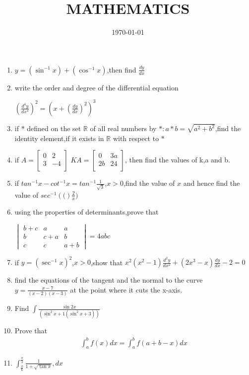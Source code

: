 \documentclass[2pt,-letter paper]{article}
\title{MATHEMATICS}
\date{\today}
\providecommand{\mydet}[1]{\ensuremath{\begin{vmatrix}#1\end{vmatrix}}}
\providecommand{\myvec}[1]{\ensuremath{\begin{bmatrix}#1\end{bmatrix}}}
\providecommand{\brak}[1]{\ensuremath{\left(#1\right)}}
\begin{document}
\maketitle

\begin{enumerate}


\item $y=(\sin^{-1}x)+(\cos^{-1}x)$,then find $\frac{dy}{dx}$
\item write the order and degree of the differential equation
                              
	$(\frac{d^4y}{dx^4})^2 = (x+(\frac{dy}{dx})^2)^3$
  	  
\item if $\ast$ defined on the set $\mathbb{R}$ of all real numbers by $\ast:a \ast b =\sqrt{a^2+b^2}$,find the identity element,if it exists in $\mathbb{R}$ with respect to $\ast$ 
\item if $A=\myvec{
	 0 & 2\\
	 3 & -4 \\}$
   $KA=\myvec{
         0 & 3a\\
	 2b & 24\\}$,
then find the values of k,a and b.
\item if $tan^{-1}x-cot^{-1}x=tan^{-1}\frac{1}{\sqrt{3}}$,$x>0$,find the value of $x$ and hence find the value of $sec^{-1}\brak({\frac{2}{x}})$
\item using the properties of determinants,prove that

	$\mydet{b+c & a & a \\
		b   & c+a & b \\
		c   & c   & a+b}= 4abc$

\item if  $y=\brak{\sec^{-1}x}^2$,$x>0$,show that $x^2{\brak{x^2-1}{\frac{d^2y}{dx^2}}+{\brak{2x^3-x}}{\frac{dy}{dx}}}-2=0$
\item find the equations of the tangent and the normal to the curve  $y=\frac{x-7}{\brak{x-2}\brak{x-3}}$ at the point where it cuts the x-axis.



\item Find $\int\frac{\sin{2x}}{\brak{\sin^2{x+1}\brak{\sin^2 {x+3}}}}$
\item Prove that 
	\begin{align*}
		\int_{a}^{b} f\brak{x}dx= \int_{a}^{b} f\brak{a+b-x}dx
	\end{align*}
		
\item $\int_{\frac{\pi}{6}}^{\frac{\pi}{3}} \frac{1}{1+\sqrt{\tan{x}}},dx$



\end{enumerate}
\end{document}
